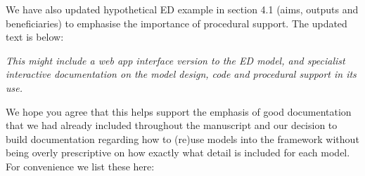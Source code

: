 \documentclass{article}
\begin{document}
\vspace{0.2cm}

We have also updated hypothetical ED example in section 4.1 (aims, outputs and beneficiaries) to emphasise the importance of procedural support.  The updated text is below:
\vspace{0.2cm}

\textit{This might include a web app interface version to the ED model, and specialist interactive documentation on the {\color{red}model design, code and procedural support in its use}.}



\vspace{0.2cm}

We hope you agree that this helps support the emphasis  of good documentation that we had already included throughout the manuscript and our decision to build documentation regarding how to (re)use models into the framework without being overly prescriptive on how exactly what detail is included for each model. For convenience we list these here:
\end{document}
